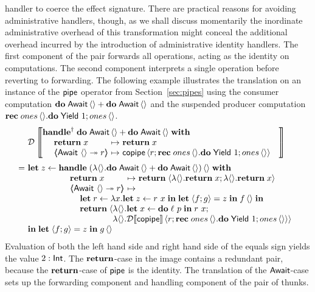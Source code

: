 \documentclass[12pt,phd,lfcs,twoside,openright,logo,leftchapter,normalheadings]{infthesis}
\theoremstyle{plain}
\theoremstyle{definition}
\begin{document}
handler to coerce the effect signature. There are practical reasons
for avoiding administrative handlers, though, as we shall discuss
momentarily the inordinate administrative overhead of this
transformation might conceal the additional overhead incurred by the
introduction of administrative identity handlers. The first component
of the pair forwards all operations, acting as the identity on
computations. The second component interprets a single operation
before reverting to forwarding.
%
The following example illustrates the translation on an instance of
the $\mathsf{pipe}$ operator from Section~\ref{sec:pipes} using the consumer
computation $\mathbf{do}\;\mathsf{Await}\,\langle  \rangle + \mathbf{do}\;\mathsf{Await}\,\langle  \rangle$ and the
suspended producer computation
$\mathbf{rec}\;ones\,\langle  \rangle.\mathbf{do}\;\mathsf{Yield}~1;ones\,\langle  \rangle$.
%
\[
  \ba{@{~}l@{~}l}
  &\mathcal{D}\left\llbracket
    \ba[m]{@{}l}
      \ShallowHandle\;\Do\;\Await\,\Unit + \Do\;\Await\,\Unit\;\With\\
        \quad\ba[m]{@{~}l@{~}c@{~}l}
           \Return\;x &\mapsto& \Return\;x\\
           \OpCase{\Await}{\Unit}{r} &\mapsto& \Copipe\,\Record{r;\Rec\;ones\,\Unit.\Do\;\Yield~1;ones\,\Unit}
         \ea
    \ea
  \right\rrbracket \medskip\\
  =& \bl
       \Let\;z \revto \bl
            \Handle\;(\lambda\Unit.\Do\;\Await\,\Unit + \Do\;\Await\,\Unit)\,\Unit\;\With\\
              \quad\ba[t]{@{~}l@{~}c@{~}l}
                 \Return\;x &\mapsto& \Return\;\Record{\lambda\Unit.\Return\;x;\lambda\Unit.\Return\;x}\\
                 \OpCase{\Await}{\Unit}{r} &\mapsto&\\
                 \multicolumn{3}{l}{
                   \quad\bl
                     \Let\;r \revto \lambda x.\Let\;z \revto r~x\;\In\;\Let\;\Record{f;g} = z\;\In\;f\,\Unit\;\In\\
                     \Return\;\Record{\bl
                       \lambda\Unit.\Let\;x \revto \Do\;\ell~p\;\In\;r~x;\\
                       \lambda\Unit. \sdtrans{\Copipe}\,\Record{r;\Rec\;ones\,\Unit.\Do\;\Yield~1;ones\,\Unit}}\el
                   \el}
              \ea
              \el\\
              \In\;\Let\;\Record{f;g} = z\;\In\;g\,\Unit
      \el
  \ea
\]
%
Evaluation of both the left hand side and right hand side of the
equals sign yields the value $2 : \mathsf{Int}$. The $\mathbf{return}$-case in the
image contains a redundant pair, because the $\mathbf{return}$-case of $\mathsf{pipe}$
is the identity. The translation of the $\mathsf{Await}$-case sets up the
forwarding component and handling component of the pair of thunks.
\end{document}
